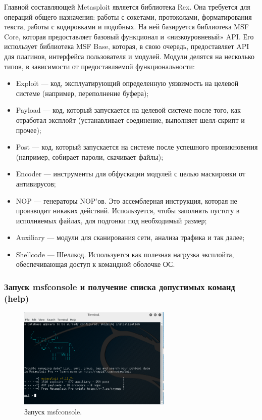 \documentclass[10pt,a4paper]{article}
\begin{document}
Главной составляющей Metasploit является библиотека Rex. Она требуется для операций общего назначения: работы с сокетами, протоколами, форматирования текста, работы с кодировками и подобных. На ней базируется библиотека MSF Core, которая предоставляет базовый функционал и «низкоуровневый» API. Его использует библиотека MSF Base, которая, в свою очередь, предоставляет API для плагинов, интерфейса пользователя и модулей. Модули делятся на несколько типов, в зависимости от предоставляемой функциональности:
\begin{itemize}
\item Exploit — код, эксплуатирующий определенную уязвимость на целевой системе (например, переполнение буфера);
\item Payload — код, который запускается на целевой системе после того, как отработал эксплойт (устанавливает соединение, выполняет шелл-скрипт и прочее);
\item Post — код, который запускается на системе после успешного проникновения (например, собирает пароли, скачивает файлы);
\item Encoder — инструменты для обфускации модулей с целью маскировки от антивирусов;
\item NOP — генераторы NOP’ов. Это ассемблерная инструкция, которая не производит никаких действий. Используется, чтобы заполнять пустоту в исполняемых файлах, для подгонки под необходимый размер;
\item Auxiliary — модули для сканирования сети, анализа трафика и так далее;
\item Shellcode — Шеллкод. Используется как полезная нагрузка эксплойта, обеспечивающая доступ к командной оболочке ОС.
\end{itemize}

\subsubsection{Запуск msfconsole и получение списка допустимых команд (help)}

\begin{figure}[H]
\begin{center}
\includegraphics[width=0.65\textwidth]{msf_start}
\caption{Запуск msfconsole.}
\end{center}
\end{figure}
\end{document}
